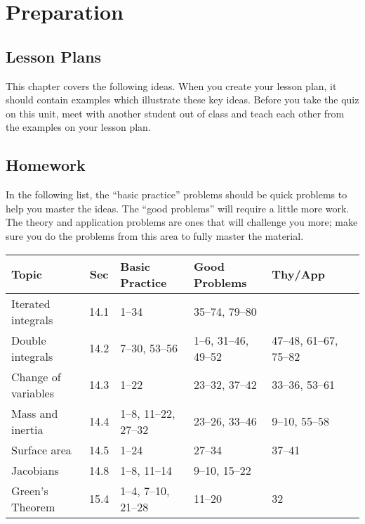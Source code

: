 \section{Preparation}

\subsection{Lesson Plans}

This chapter covers the following ideas. When you create your lesson plan, it should contain examples which illustrate these key ideas. Before you take the quiz on this unit, meet with another student out of class and teach each other from the examples on your lesson plan. 





\subsection{Homework}

In the following list, the ``basic practice'' problems should be quick
problems to help you master the ideas.  The ``good problems'' will
require a little more work.  The theory and application problems are
ones that will challenge you more; make sure you do the problems from
this area to fully master the material.  

\smallskip 
{\noindent
\begin{tabular}{|l|c|l|l|l|l|}\hline
Topic &Sec &Basic Practice &Good Problems &Thy/App \\\hline
Iterated integrals & 14.1 & 1--34 & 35--74, 79--80 & \\\hline
Double integrals & 14.2 & 7--30, 53--56 & 1--6, 31--46, 49--52 & 47--48, 61--67, 75--82\\\hline
Change of variables & 14.3 & 1--22 & 23--32, 37--42 & 33--36, 53--61\\\hline
Mass and inertia & 14.4 & 1--8, 11--22, 27--32 & 23--26, 33--46 & 9--10, 55--58\\\hline
Surface area & 14.5 & 1--24 & 27--34 & 37--41\\\hline
Jacobians & 14.8 & 1--8, 11--14 & 9--10, 15--22 & \\\hline
Green's Theorem & 15.4 & 1--4, 7--10, 21--28 & 11--20 & 32\\\hline
\end{tabular}
} 
\medskip

